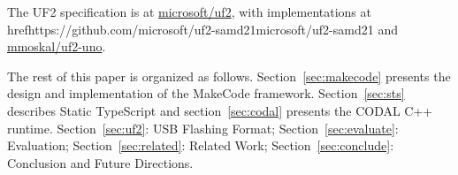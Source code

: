The UF2 specification is at \href{https://github.com/microsoft/uf2}{microsoft/uf2},
with implementations at href{https://github.com/microsoft/uf2-samd21}{microsoft/uf2-samd21}
and \href{https://github.com/mmoskal/uf2-uno}{mmoskal/uf2-uno}.

The rest of this paper is organized as follows. Section~\ref{sec:makecode} presents the design and implementation of the MakeCode framework. 
Section~\ref{sec:sts} describes Static TypeScript and section~\ref{sec:codal} presents the CODAL C++ runtime. 
Section~\ref{sec:uf2}: USB Flashing Format;
Section~\ref{sec:evaluate}: Evaluation;
Section~\ref{sec:related}: Related Work;
Section~\ref{sec:conclude}: Conclusion and Future Directions. 
